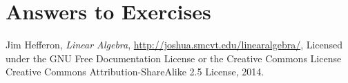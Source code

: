 \documentclass[twocolumn, letterpaper]{book}
\begin{document}
\onecolumn
\thispagestyle{empty}
\titleGP
\newpage
\twocolumn

\thispagestyle{empty}
\tableofcontents

\mainmatter



\appendix
\chapter{Answers to Exercises}
\shipoutAnswer

\onecolumn
\begin{thebibliography}{9}

  Jim Hefferon,
  \emph{Linear Algebra},
  \url{http://joshua.smcvt.edu/linearalgebra/},
  Licensed under the GNU Free Documentation License or the Creative Commons License Creative Commons Attribution-ShareAlike 2.5 License,
  2014.

\end{thebibliography}

\printindex
\end{document}
